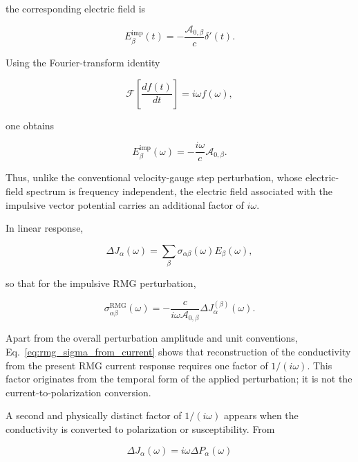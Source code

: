 the corresponding electric field is

\begin{equation}
E_{\beta}^{\mathrm{imp}}(t)
=
-\frac{\mathcal{A}_{0,\beta}}{c}
\delta'(t).
\label{eq:E_delta_prime}
\end{equation}

Using the Fourier-transform identity

\begin{equation}
\mathcal{F}
\left[
\frac{df(t)}{dt}
\right]
=
i\omega f(\omega),
\label{eq:fft_derivative_repeated}
\end{equation}

one obtains

\begin{equation}
E_{\beta}^{\mathrm{imp}}(\omega)
=
-\frac{i\omega}{c}
\mathcal{A}_{0,\beta}.
\label{eq:E_impulse_frequency}
\end{equation}

Thus, unlike the conventional velocity-gauge step perturbation, whose
electric-field spectrum is frequency independent, the electric field
associated with the impulsive vector potential carries an additional
factor of $i\omega$.

In linear response,

\begin{equation}
\Delta J_{\alpha}(\omega)
=
\sum_{\beta}
\sigma_{\alpha\beta}(\omega)
E_{\beta}(\omega),
\label{eq:J_sigma_E_rmg}
\end{equation}

so that for the impulsive RMG perturbation,

\begin{equation}
\sigma_{\alpha\beta}^{\mathrm{RMG}}(\omega)
=
-\frac{c}
       {i\omega\mathcal{A}_{0,\beta}}
\Delta J_{\alpha}^{(\beta)}(\omega).
\label{eq:rmg_sigma_from_current}
\end{equation}

Apart from the overall perturbation amplitude and unit conventions,
Eq.~\eqref{eq:rmg_sigma_from_current} shows that reconstruction of the
conductivity from the present RMG current response requires one factor
of $1/(i\omega)$.  This factor originates from the temporal form of the
applied perturbation; it is not the current-to-polarization conversion.

A second and physically distinct factor of $1/(i\omega)$ appears when
the conductivity is converted to polarization or susceptibility.  From

\begin{equation}
\Delta J_{\alpha}(\omega)
=
i\omega\Delta P_{\alpha}(\omega)
\end{equation}

